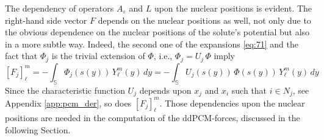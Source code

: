 The dependency of operators $A_\varepsilon$ and $L$ upon the nuclear positions is evident. The right-hand side vector $F$ depends on the nuclear positions as well, not only due to the obvious dependence on the nuclear positions of the solute's potential but also in a more subtle way. Indeed, the second one of the expansions \eqref{eq:71} and the fact that $\Phi_j$ is the trivial extension of $\Phi$, i.e., $\Phi_j = U_j \, \Phi$ imply
\begin{equation}\label{eq:25}
[F_j]_\ell^m = - \int_{\mathbb{S}} \Phi_j(s(y)) \, Y_\ell^m(y) \,dy = - \int_{\mathbb{S}} U_j(s(y)) \, \Phi(s(y)) \, Y_\ell^m(y) \,dy
\end{equation}
Since the characteristic function $U_j$ depends upon $x_j$ and $x_i$ such that $i \in N_j$, see Appendix \ref{app:pcm_der}, so does $[F_j]_\ell^m$. 
Those dependencies upon the nuclear positions are needed in the computation of the ddPCM-forces, discussed in the following Section.


%
%
%

